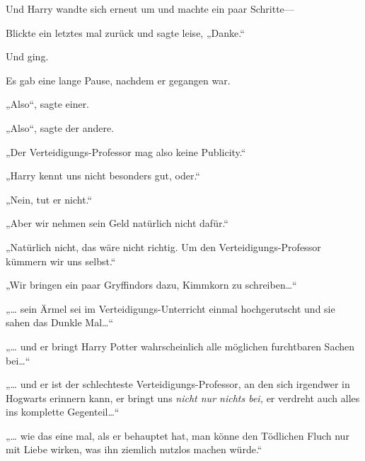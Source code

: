 Und Harry wandte sich erneut um und machte ein paar Schritte—

Blickte ein letztes mal zurück und sagte leise, „Danke.“

Und ging.

Es gab eine lange Pause, nachdem er gegangen war.

„Also“, sagte einer.

„Also“, sagte der andere.

„Der Verteidigungs-Professor mag also keine Publicity.“

„Harry kennt uns nicht besonders gut, oder.“

„Nein, tut er nicht.“

„Aber wir nehmen sein Geld natürlich nicht dafür.“

„Natürlich nicht, das wäre nicht richtig. Um den Verteidigungs-Professor kümmern wir uns selbst.“

„Wir bringen ein paar Gryffindors dazu, Kimmkorn zu schreiben…“

„… sein Ärmel sei im Verteidigungs-Unterricht einmal hochgerutscht und sie sahen das Dunkle Mal…“

„… und er bringt Harry Potter wahrscheinlich alle möglichen furchtbaren Sachen bei…“

„… und er ist der schlechteste Verteidigungs-Professor, an den sich irgendwer in Hogwarts erinnern kann, er bringt uns \emph{nicht nur nichts bei,} er verdreht auch alles ins komplette Gegenteil…“

„… wie das eine mal, als er behauptet hat, man könne den Tödlichen Fluch nur mit Liebe wirken, was ihn ziemlich nutzlos machen würde.“

